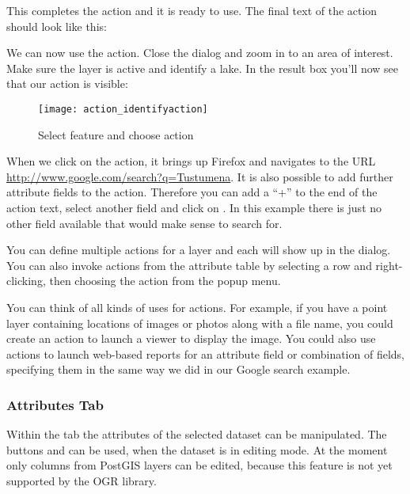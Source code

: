 This completes the action and it is ready to use. The final text of the action
should look like this:

\begin{center}
\end{center}

We can now use the action. Close the  dialog and zoom in to an area
of interest. Make sure the  layer is active and identify a
lake. In the result box you'll now see that our action is visible:

\begin{figure}[H]
   \begin{center}
   \caption{Select feature and choose action \nixcaption}\label{fig:identify_action}\smallskip
   \texttt{[image: action\_identifyaction]} 
\end{center}  
\end{figure}

When we click on the action, it brings up Firefox and navigates to the URL
\url{http://www.google.com/search?q=Tustumena}. It is also possible to add further 
attribute fields to the action. Therefore you can add a ``+'' to the end of the action 
text, select another field and click on . In this example there 
is just no other field available that would make sense to search for.

You can define multiple actions for a layer and each will show up in the
 dialog. You can also invoke actions from the attribute table
by selecting a row and right-clicking, then choosing the action from the popup
menu.

You can think of all kinds of uses for actions. For example, if you have a point layer
containing locations of images or photos along with a file name, you could
create an action to launch a viewer to display the image. You could also use
actions to launch web-based reports for an attribute field or combination of
fields, specifying them in the same way we did in our Google search example.

\subsubsection{Attributes Tab}\label{label_attributes}
Within the  tab the attributes of the selected dataset can be
manipulated. The buttons  and  can be
used, when the dataset is in editing mode. At the moment only columns from 
PostGIS layers can be edited, because this feature is not yet supported by 
the OGR library. 

